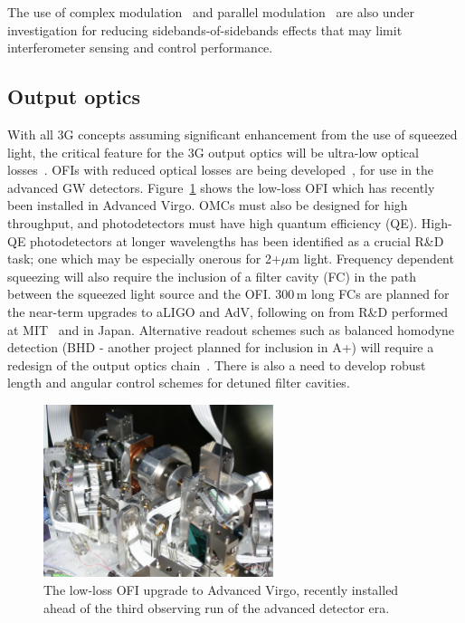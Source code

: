 The use of complex modulation~\cite{complexmod} and parallel modulation~\cite{kagraMZI} are also under investigation for reducing sidebands-of-sidebands effects that may limit interferometer sensing and control performance.

\subsection{Output optics}
With all 3G concepts assuming significant enhancement from the use of squeezed light, the critical feature for the 3G output optics will be ultra-low optical losses~\cite{squeeze_lossbudget}. OFIs with reduced optical losses are being developed~\cite{EGOLLFI,UFLLFI}, for use in the advanced GW detectors. Figure~\ref{fig:AdVLLFI} shows the low-loss OFI which has recently been installed in Advanced Virgo. OMCs must also be designed for high throughput, and photodetectors must have high quantum efficiency (QE). High-QE photodetectors at longer wavelengths has been identified as a crucial R\&D task; one which may be especially onerous for 2+$\mu$m light. Frequency dependent squeezing will also require the inclusion of a filter cavity (FC) in the path between the squeezed light source and the OFI. 300\,m long FCs are planned for the near-term upgrades to aLIGO and AdV, following on from R\&D performed at MIT~\cite{MITFC} and in Japan\cite{TAMA_FDS2016}. Alternative readout schemes such as balanced homodyne detection (BHD - another project planned for inclusion in A+) will require a redesign of the output optics chain~\cite{BHD}. There is also a need to develop robust length and angular control schemes for detuned filter cavities.

\begin{figure}[htb]
\centering
\includegraphics[width=0.6\textwidth]{Figures/LLFI.png}
\caption{The low-loss OFI upgrade to Advanced Virgo, recently installed ahead of the third observing run of the advanced detector era.\label{fig:AdVLLFI}}
\end{figure}

